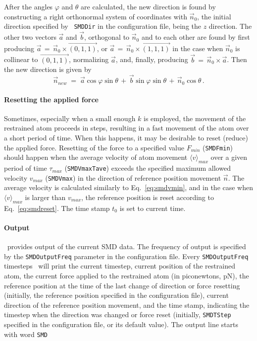 After the angles $\varphi$ and $\theta$ are calculated, the new
direction is found by constructing a right orthonormal system of
coordinates with $\vec n_0$, the initial direction specified by {\tt
SMDDir} in the configuration file, being the $z$ direction.  The
other two vectors $\vec a$ and $\vec b$, orthogonal to $\vec n_0$ and
to each other are found by first producing $\vec a \, = \, \vec n_0
\times
\vec{(0, 1, 1)}$, or $\vec a \, = \, \vec n_0 \times 
\vec{(1, 1, 1)}$ in the case when $\vec n_0$ is collinear to 
$\vec{(0, 1, 1)}$, normalizing $\vec a$, and, finally, producing 
$\vec b \, = \, \vec n_0 \times \vec a$. Then the new direction is
given by 
\begin{equation}
\vec n_{new} \; = \; \vec a \cos\varphi \sin\theta \, + \,
	\vec b \sin\varphi \sin\theta \, + \,
	\vec n_0 \cos\theta \, .
\end{equation}


\paragraph*{Resetting the applied force}

Sometimes, especially when a small enough $k$ is employed, the
movement of the restrained atom proceeds in steps, resulting in a fast
movement of the atom over a short period of time. When this happens,
it may be desirable to reset (reduce) the applied force. Resetting of
the force to a specified value $F_{min}$ ({\tt SMDFmin}) should happen
when the average velocity of atom movement $\langle v\rangle_{max}$
over a given period of time $\tau_{max}$ ({\tt SMDVmaxTave}) exceeds
the specified maximum allowed velocity $v_{max}$ ({\tt SMDVmax}) in
the direction of reference position movement $\vec n$. The average
velocity is calculated similarly to Eq.~\ref{eq:smdvmin}, and in the
case when $\langle v\rangle_{max}$ is larger than $v_{max}$, the
reference position is reset according to Eq.~\ref{eq:smdreset}. The
time stamp $t_0$ is set to current time.


\paragraph*{Output}

\NAMD\ provides output of the current SMD data. The frequency of
output is specified by the {\tt SMDOutputFreq} parameter in the
configuration file. Every {\tt SMDOutputFreq} timesteps \NAMD\ will
print the current timestep, current position of the restrained atom,
the current force applied to the restrained atom (in piconewtons, pN),
the reference position at the time of the last change of
direction or force resetting (initially, the reference position
specified in the configuration file), current direction of the
reference position movement, and the time stamp, indicating the
timestep when the direction was changed or force reset (initially, 
{\tt SMDTStep} specified in the configuration file, or its default
value). The output line starts with word {\tt SMD}

